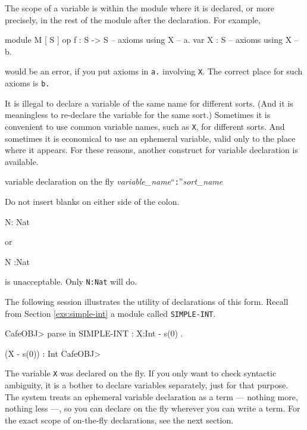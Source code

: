 \documentclass[a4paper]{memoir}
\begin{document}
The scope of a variable is within the module where it is declared, or
more precisely, in the rest of the module after the declaration.
For example,
\begin{vvtm}
\begin{ccode}
  module M {
    [ S ]
    op f : S -> S
    -- axioms using X -- a.
    var X : S
    -- axioms using X -- b.
  }
\end{ccode}
\end{vvtm}
would be an error, if you put axioms in \verb|a.| involving \verb|X|.
The correct place for such axioms is \verb|b.|

It is illegal to declare a variable of the same name for different sorts.
(And it is meaningless to re-declare the variable for the same sort.)
Sometimes it is 
convenient 
to use common variable names, such as
\verb|X|, for different sorts. And sometimes it is economical to
use an ephemeral variable, valid only to the place where it appears.
For these reasons, another construct for variable declaration is available.

\begin{bsyntax} variable declaration on the fly \Hline
\textit{variable\_name}``\texttt{:}''\textit{sort\_name}
\end{bsyntax}

\begin{warning}
  Do not insert blanks on either side of the colon.
  \begin{vvtm}
\begin{ccode}
    N: Nat
  \end{ccode}
\end{vvtm}
  or
  \begin{vvtm}
\begin{ccode}
    N :Nat
  \end{ccode}
\end{vvtm}
  is unacceptable. Only \verb|N:Nat| will do.
\end{warning}

The following session illustrates the utility of declarations of
this form. Recall from Section \ref{exs:simple-int} a module called
\verb|SIMPLE-INT|.
\begin{vvtm}
\begin{ccode}
  CafeOBJ> parse in SIMPLE-INT : X:Int - s(0) .

  (X - s(0)) : Int
  CafeOBJ>
\end{ccode}
\end{vvtm}
The variable \verb|X| was declared on the fly. If you only want
to check syntactic ambiguity, it is a bother to declare
variables separately, just for that purpose.
The system treats an ephemeral variable declaration as a term ---
nothing more, nothing less ---,
so you can declare on the fly wherever you can write a term.
For the exact scope of on-the-fly declarations, see the next
section.
\end{document}
